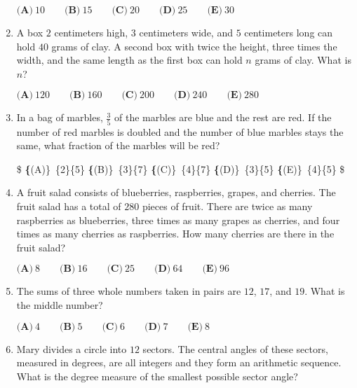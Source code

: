 \documentclass{article}
\begin{document}
\begin{enumerate}[label=\arabic*., itemsep=0.5em]
$ \textbf{(A)}\ 10\qquad\textbf{(B)}\ 15\qquad\textbf{(C)}\ 20\qquad\textbf{(D)}\ 25\qquad\textbf{(E)}\ 30 $\par \vspace{0.5em}\item A box $2$ centimeters high, $3$ centimeters wide, and $5$ centimeters long can hold $40$ grams of clay.  A second box with twice the height, three times the width, and the same length as the first box can hold $n$ grams of clay.  What is $n$?

$\textbf{(A)}\ 120\qquad\textbf{(B)}\ 160\qquad\textbf{(C)}\ 200\qquad\textbf{(D)}\ 240\qquad\textbf{(E)}\ 280$\par \vspace{0.5em}\item In a bag of marbles, $\tfrac{3}{5}$ of the marbles are blue and the rest are red.  If the number of red marbles is doubled and the number of blue marbles stays the same, what fraction of the marbles will be red?

\$ \textbf\{(A)\}\ \dfrac\{2\}\{5\}
\qquad\textbf\{(B)\}\ \dfrac\{3\}\{7\}
\qquad\textbf\{(C)\}\ \dfrac\{4\}\{7\}
\qquad\textbf\{(D)\}\ \dfrac\{3\}\{5\}
\qquad\textbf\{(E)\}\ \dfrac\{4\}\{5\}
 \$\par \vspace{0.5em}\item A fruit salad consists of blueberries, raspberries, grapes, and cherries.  The fruit salad has a total of $280$ pieces of fruit.  There are twice as many raspberries as blueberries, three times as many grapes as cherries, and four times as many cherries as raspberries.  How many cherries are there in the fruit salad?

$ \textbf{(A)}\ 8\qquad\textbf{(B)}\ 16\qquad\textbf{(C)}\ 25\qquad\textbf{(D)}\ 64\qquad\textbf{(E)}\ 96 $\par \vspace{0.5em}\item The sums of three whole numbers taken in pairs are $12$, $17$, and $19$.  What is the middle number?

$ \textbf{(A)}\ 4\qquad\textbf{(B)}\ 5\qquad\textbf{(C)}\ 6\qquad\textbf{(D)}\ 7\qquad\textbf{(E)}\ 8 $\par \vspace{0.5em}\item Mary divides a circle into $12$ sectors.  The central angles of these sectors, measured in degrees, are all integers and they form an arithmetic sequence.  What is the degree measure of the smallest possible sector angle?


\end{enumerate}
\end{document}
